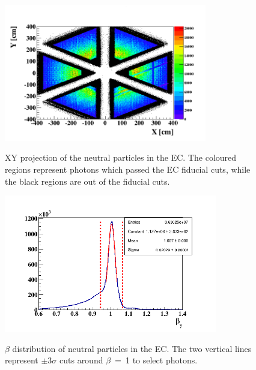 \begin{figure}[tp]
\begin{minipage}[c]{.46\linewidth}
\hspace{-0.3in}
\includegraphics[height=6.0cm]{fig_analysis/photons_EC_XY_photon_2.png}
\caption{XY projection of the neutral particles in the EC. The coloured regions represent photons which passed the EC fiducial cuts, while the black regions are out of the fiducial cuts.} 
\label{fig:photons_EC_XY_photon_2.png}
\end{minipage} \hfill
\begin{minipage}[c]{.46\linewidth}
\hspace{-0.5in}
\includegraphics[height=6.0cm]{fig_analysis/photons_beta_EC.png}
\caption{$\beta$ distribution of neutral particles in the EC. The two vertical lines represent $\pm$3$\sigma$ cuts around $\beta$~=~1 to select photons.}
\vspace{+0.3in}
\label{fig:photons_beta_EC}
\end{minipage}
\end{figure}



